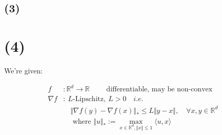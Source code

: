 \documentclass{article}
\DeclareMathOperator{\domain}{dom}
\begin{document}
\begin{comment}
By Jensen's inequality
\footnote{Boyd, S. P., and L. Vandenberghe, \textit{Convex Optimization}, 1st ed., Cambridge University Press, Cambridge, UK, 2004, p.~77-78.}:

\begin{tcolorbox}[greenbox, title = Jensen's inequality]
    If $x$ is a random variable such that $x \in \domain f$ with probability one, and $f$ is convex, then we have:
    \begin{align*}
        f \left( \mathsf{E} [x] \right) \leq \mathsf{E} \left[ f (x) \right]
    \end{align*}
\end{tcolorbox}

Now let: 

\begin{align*}
    f (X) = \log X \qquad \text{ where } X = \frac{W_T (x)}{W_T^\star}
\end{align*}

But since $f$ is concave, we have:

\begin{align*}
    &f \left( \mathsf{E} [X] \right) \geq \mathsf{E} \left[ f (X) \right] \\
    \Rightarrow \ &\mathsf{E} \left[ \log (X) \right] \leq \log \left( \mathsf{E} [X] \right) \\
    \Rightarrow \ &\mathsf{E} \left[ \log \left( \frac{W_T (x)}{W_T^\star} \right) \right] \leq \log \left( \mathsf{E} \left[ \frac{W_T (x)}{W_T^\star} \right] \right)
\end{align*}
\end{comment}

\subsection*{(3)}

\section*{(4)}

We're given:

\begin{align*}
    f&: \mathbb{R}^d \to \mathbb{R} \qquad \text{ differentiable, may be non-convex} \\
    \nabla f&: \ L\text{-Lipschitz}, \ L > 0 \quad i.e. \\
    &\quad \Vert \nabla f ( y ) - \nabla f ( x ) \Vert_* \leq L \Vert y - x \Vert , \quad \forall x, y \in \mathbb{R}^d \\
    &\quad \text{ where } \Vert u \Vert_* := \underset{x \in \mathbb{R}^d, \Vert x \Vert \leq 1}{\max} \langle u, x \rangle 
\end{align*}
\end{document}
